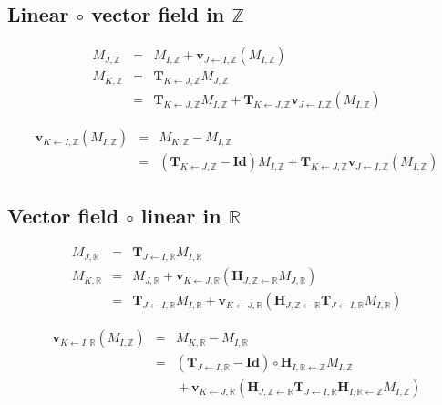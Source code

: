\subsection{Linear $\circ$ vector field in $\mathbb{Z}$ }

\begin{eqnarray*}
M_{J, \mathbb{Z}} & = &
M_{I, \mathbb{Z}} 
+ \mathbf{v}_{J \leftarrow I, \mathbb{Z}}(M_{I, \mathbb{Z}}) \\
M_{K, \mathbb{Z}} & = &
 \mathbf{T}_{K \leftarrow J, \mathbb{Z}} M_{J, \mathbb{Z}} \\
& = &
\mathbf{T}_{K \leftarrow J, \mathbb{Z}} 
M_{I, \mathbb{Z}} 
+ \mathbf{T}_{K \leftarrow J, \mathbb{Z}} 
\mathbf{v}_{J \leftarrow I, \mathbb{Z}}(M_{I, \mathbb{Z}})
\end{eqnarray*}

\begin{eqnarray*}
\mathbf{v}_{K \leftarrow I, \mathbb{Z}}(M_{I, \mathbb{Z}})
& = &
M_{K, \mathbb{Z}} - M_{I, \mathbb{Z}} \\
& = &
\left( \mathbf{T}_{K \leftarrow J, \mathbb{Z}} - \mathbf{Id} \right)
M_{I, \mathbb{Z}} 
+ \mathbf{T}_{K \leftarrow J, \mathbb{Z}} 
\mathbf{v}_{J \leftarrow I, \mathbb{Z}}(M_{I, \mathbb{Z}})
\end{eqnarray*}





\subsection{Vector field $\circ$ linear in $\mathbb{R}$ }

\begin{eqnarray*}
M_{J, \mathbb{R}} & = &  
\mathbf{T}_{J \leftarrow I, \mathbb{R}} M_{I, \mathbb{R}}  \\
M_{K, \mathbb{R}} & = &
M_{J, \mathbb{R}} 
+ \mathbf{v}_{K \leftarrow J, \mathbb{R}}(\mathbf{H}_{J, \mathbb{Z} \leftarrow \mathbb{R}}  M_{J, \mathbb{R}}) \\
& = &
\mathbf{T}_{J \leftarrow I, \mathbb{R}} M_{I, \mathbb{R}}
+ \mathbf{v}_{K \leftarrow J, \mathbb{R}}(\mathbf{H}_{J, \mathbb{Z} \leftarrow \mathbb{R}}  \mathbf{T}_{J \leftarrow I, \mathbb{R}} M_{I, \mathbb{R}} )
\end{eqnarray*}

\begin{eqnarray*}
\mathbf{v}_{K \leftarrow I, \mathbb{R}}(M_{I, \mathbb{Z}})
& = &
M_{K, \mathbb{R}} - M_{I, \mathbb{R}} \\
& = &
\left( \mathbf{T}_{J \leftarrow I, \mathbb{R}} - \mathbf{Id} \right)
\circ 
\mathbf{H}_{I, \mathbb{R} \leftarrow \mathbb{Z}} 
M_{I, \mathbb{Z}}  \\
& & {}
+ 
\mathbf{v}_{K \leftarrow J, \mathbb{R}}
(\mathbf{H}_{J, \mathbb{Z} \leftarrow \mathbb{R}}
\mathbf{T}_{J \leftarrow I, \mathbb{R}} 
\mathbf{H}_{I, \mathbb{R} \leftarrow \mathbb{Z}}
M_{I, \mathbb{Z}} )
\end{eqnarray*}



